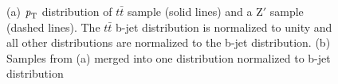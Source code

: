 \begin{figure}[h]
    \centering
    \caption{  (a) $\textrm{\textit{p}}_{\textrm{T}}$ distribution of $t\bar{t}$ sample (solid lines) and a Z$'$ sample (dashed lines). The $t\bar{t}$ b-jet distribution is normalized to unity and all other distributions are normalized to the b-jet distribution. (b) Samples from (a) merged into one distribution normalized to b-jet distribution }
\label{fig:hybrid-noscale}
\end{figure}

